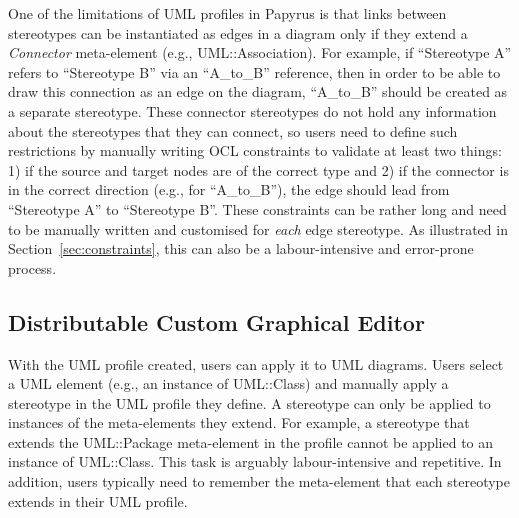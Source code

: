 One of the limitations of UML profiles in Papyrus is that links between stereotypes can be instantiated as edges in a diagram only if they extend a \textit{Connector} meta-element (e.g., UML::Association).  
For example, if ``Stereotype A'' refers to ``Stereotype B'' via an ``A\_to\_B'' reference, then in order to be able to draw this connection as an edge on the diagram, ``A\_to\_B'' should be created as a separate stereotype. 
These connector stereotypes do not hold any information about the stereotypes that they can connect, so users need to define such restrictions by manually writing OCL constraints to validate at least two things: 1) if the source and target nodes are of the correct type and 2) if the connector is in the correct direction (e.g., for ``A\_to\_B''), the edge should lead from ``Stereotype A'' to ``Stereotype B''. 
These constraints can be rather long and need to be manually written and customised for \textit{each} edge stereotype. As illustrated in Section~\ref{sec:constraints}, this can also be a labour-intensive and error-prone process.

\subsection{Distributable Custom Graphical Editor}
With the UML profile created, users can apply it to UML diagrams. 
Users select a UML element (e.g., an instance of UML::Class) and manually apply a stereotype in the UML profile they define. 
A stereotype can only be applied to instances of the meta-elements they extend.
For example, a stereotype that extends the UML::Package meta-element in the profile cannot be applied to an instance of UML::Class. 
This task is arguably labour-intensive and repetitive. 
In addition, users typically need to remember the meta-element that each stereotype extends in their UML profile. 

